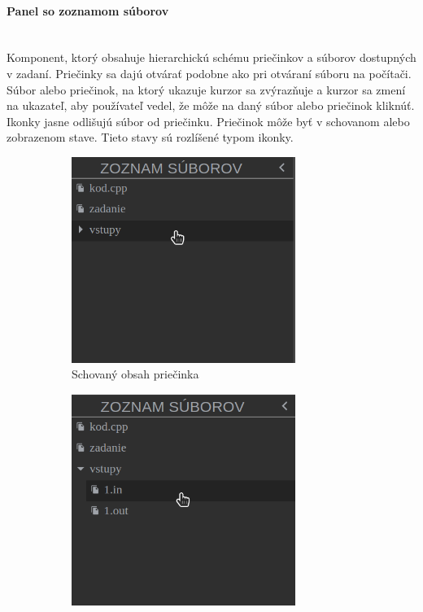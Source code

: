 \paragraph{Panel so zoznamom súborov}\leavevmode\\
Komponent, ktorý obsahuje hierarchickú schému priečinkov a súborov dostupných v zadaní. Priečinky sa
dajú otvárať podobne ako pri otváraní súboru na počítači. Súbor alebo priečinok, na ktorý ukazuje
kurzor sa zvýrazňuje a kurzor sa zmení na ukazateľ, aby používateľ vedel, že môže na daný súbor
alebo priečinok kliknúť. Ikonky jasne odlišujú súbor od priečinku. Priečinok môže byť v schovanom
alebo zobrazenom stave. Tieto stavy sú rozlíšené typom ikonky.
\begin{figure}[H]
\centering
\begin{subfigure}{.5\textwidth}
  \centering
  \includegraphics[width=0.8\textwidth]{images/schovany_zoznam}
  \caption[Schovaný obsah priečinka]{Schovaný obsah priečinka}
  \label{obr:schovany_zoznam}
\end{subfigure}%
\begin{subfigure}{.5\textwidth}
  \centering
  \includegraphics[width=0.8\textwidth]{images/zobrazeny_zoznam}

\end{subfigure}
\end{figure}
